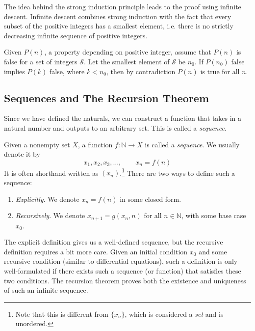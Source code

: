   The idea behind the strong induction principle leads to the proof using infinite descent. Infinite descent combines strong induction with the fact that every subset of the positive integers has a smallest element, i.e. there is no strictly decreasing infinite sequence of positive integers. 

  \begin{theorem}
    Given $P(n)$, a property depending on positive integer, assume that $P(n)$ is false for a set of integers $\mathcal{S}$. Let the smallest element of $\mathcal{S}$ be $n_0$. If $P(n_0)$ false implies $P(k)$ false, where $k < n_0$, then by contradiction $P(n)$ is true for all $n$. 
  \end{theorem} 

\subsection{Sequences and The Recursion Theorem}

  Since we have defined the naturals, we can construct a function that takes in a natural number and outputs to an arbitrary set. This is called a \textit{sequence}. 

  \begin{definition}[Sequence]
    \label{def:sequence}
    Given a nonempty set $X$, a function $f: \mathbb{N} \rightarrow X$ is called a \textit{sequence}. We usually denote it by 
    \begin{equation}
      x_1, x_2, x_3, \ldots, \qquad x_n = f(n)
    \end{equation}
    It is often shorthand written as $(x_n)$.\footnote{Note that this is different from $\{x_n\}$, which is considered a \textit{set} and is unordered.} There are two ways to define such a sequence: 
    \begin{enumerate}
      \item \textit{Explicitly}. We denote $x_n = f(n)$ in some closed form. 
      \item \textit{Recursively}. We denote $x_{n+1} = g(x_n, n)$ for all $n \in \mathbb{N}$, with some base case $x_0$. 
    \end{enumerate}
  \end{definition}

  The explicit definition gives us a well-defined sequence, but the recursive definition requires a bit more care. Given an initial condition $x_0$ and some recursive condition (similar to differential equations), such a definition is only well-formulated if there exists such a sequence (or function) that satisfies these two conditions. The recursion theorem proves both the existence and uniqueness of such an infinite sequence. 

